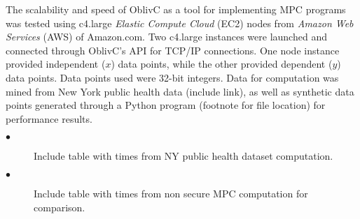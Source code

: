 \documentclass{article}
\begin{document}
The scalability and speed of OblivC as a tool for implementing MPC programs was tested using c4.large \emph{Elastic Compute Cloud} (EC2) nodes from \emph{Amazon Web Services} (AWS) of Amazon.com\textregistered. Two c4.large instances were launched and connected through OblivC's API for TCP/IP connections. One node instance provided independent ($x$) data points, while the other provided dependent ($y$) data points. Data points used were 32-bit integers. Data for computation was mined from New York public health data (include link), as well as synthetic data points generated through a Python program (footnote for file location) for performance results.

\begin{center}
\end{center}






\begin{description}
\item[$\bullet$] Include table with times from NY public health dataset computation.
\item[$\bullet$] Include table with times from non secure MPC computation for comparison.
\end{description}
\end{document}
